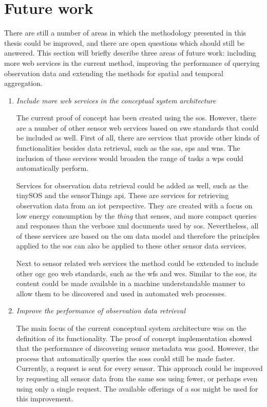 \section{Future work}
\label{FW}
There are still a number of areas in which the methodology presented in this thesis could be improved, and there are open questions which should still be answered. This section will briefly describe three areas of future work: including more web services in the current method, improving the performance of querying observation data and extending the methods for spatial and temporal aggregation.

\begin{enumerate}
	\item \textit{Include more web services in the conceptual system architecture}
	\label{more}
	
	The current proof of concept has been created using the \ac{sos}. However, there are a number of other sensor web services based on \ac{swe} standards that could be included as well. First of all, there are services that provide other kinds of functionalities besides data retrieval, such as the \acf{sas}, \acf{sps} and \acf{wns}. The inclusion of these services would broaden the range of tasks a \ac{wps} could automatically perform. 
	
	Services for observation data retrieval could be added as well, such as the tinySOS and the sensorThings \ac{api}. These are services for retrieving observation data from an \ac{iot} perspective. They are created with a focus on low energy consumption by the \textit{thing} that senses, and more compact queries and responses than the verbose \ac{xml} documents used by \ac{sos}. Nevertheless, all of these services are based on the \ac{om} data model and therefore the principles applied to the \ac{sos} can also be applied to these other sensor data services.  
	
	Next to sensor related web services the method could be extended to include other \ac{ogc} geo web standards, such as the \acf{wfs} and \acf{wcs}. Similar to the \ac{sos}, its content could be made available in a machine understandable manner to allow them to be discovered and used in automated web processes.    
	
	\item \textit{Improve the performance of observation data retrieval}
	\label{faster}
	
	The main focus of the current conceptual system architecture was on the definition of its functionality. The proof of concept implementation showed that the performance of discovering sensor metadata was good. However, the process that automatically queries the \aclp{sos} could still be made faster. Currently, a request is sent for every sensor. This approach could be improved by requesting all sensor data from the same \ac{sos} using fewer, or perhaps even using only a single request. The available offerings of a \ac{sos} might be used for this improvement.      
	

\end{enumerate}
